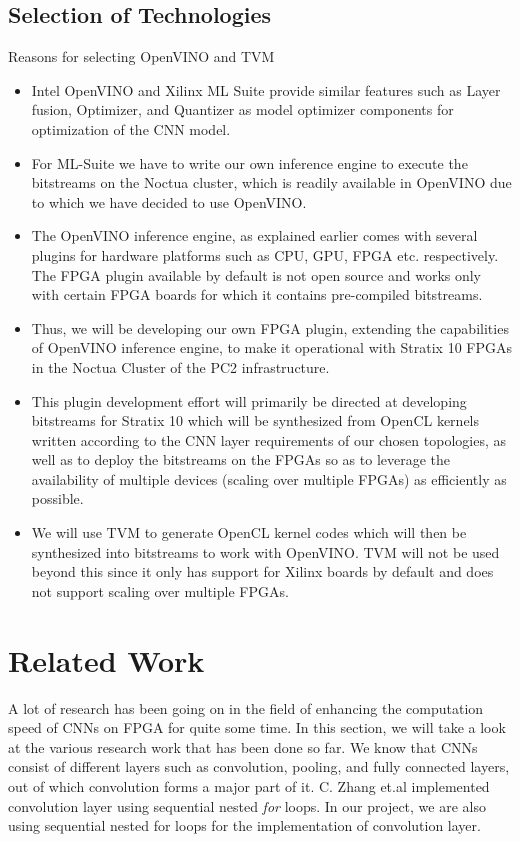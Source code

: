 \documentclass[titlepage]{report}
\begin{document}
 \section{Selection of Technologies}
Reasons for selecting OpenVINO and TVM
 \begin{itemize}
 \item Intel OpenVINO and Xilinx ML Suite provide similar features such as Layer fusion, Optimizer, and Quantizer as model optimizer components for optimization of the CNN model. 
 \item For ML-Suite we have to write our own inference engine  to execute the bitstreams on the Noctua cluster, which is readily available in OpenVINO due to which we have decided to use OpenVINO.
 \item The OpenVINO inference engine, as explained earlier comes with several plugins for hardware platforms such as CPU, GPU, FPGA etc. respectively. The FPGA plugin available by default is not open source and works only with certain FPGA boards for which it contains pre-compiled bitstreams. 
 \item Thus, we will be developing our own FPGA plugin, extending the capabilities of OpenVINO inference engine, to make it operational with Stratix 10 FPGAs in the Noctua Cluster of the PC2 infrastructure. 
 \item This plugin development effort will primarily be directed at developing bitstreams for Stratix 10 which will be synthesized from OpenCL kernels written according to the CNN layer requirements of our chosen topologies, as well as to deploy the bitstreams on the FPGAs so as to leverage the availability of multiple devices (scaling over multiple FPGAs) as efficiently as possible.    
 \item We will use TVM to generate OpenCL kernel codes which will then be synthesized into bitstreams to work with OpenVINO. TVM will not be used beyond this since it only has support for Xilinx boards by default and does not support scaling over multiple FPGAs.

 \end{itemize}



\chapter{Related Work}
A lot of research has been going on in the field of enhancing the computation speed of CNNs on FPGA for quite some time. In this section, we will take a look at the various research work that has been done so far. We know that CNNs consist of different layers such as convolution, pooling, and fully connected layers, out of which convolution forms a major part of it. C. Zhang et.al implemented convolution layer using sequential nested \textit{for} loops. In our project, we are also using sequential nested for loops for the implementation of convolution layer.
\end{document}
